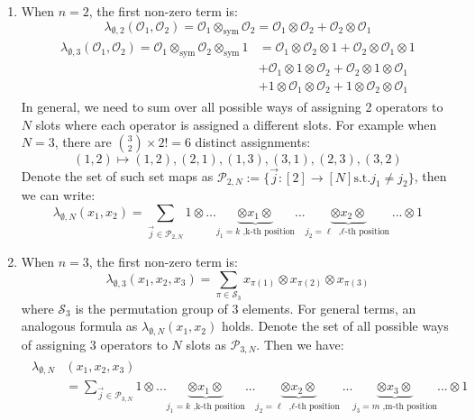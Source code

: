 \documentclass[a4paper,11pt]{article}
\theoremstyle{definition}
\numberwithin{equation}{section}
\begin{document}
\begin{enumerate}
    \item When $n = 2$, the first non-zero term is:
    \begin{equation}
        \lambda_{\emptyset, 2}(\mathcal{O}_1,\mathcal{O}_2) = \mathcal{O}_1\otimes_\text{sym}\mathcal{O}_2 = \mathcal{O}_1\otimes\mathcal{O}_2 + \mathcal{O}_2 \otimes\mathcal{O}_1
    \end{equation}
    \begin{align}
        \begin{split}
            \lambda_{\emptyset, 3}(\mathcal{O}_1,\mathcal{O}_2) = \mathcal{O}_1\otimes_\text{sym}\mathcal{O}_2\otimes_\text{sym} 1 &= \mathcal{O}_1\otimes\mathcal{O}_2 \otimes 1+ \mathcal{O}_2\otimes\mathcal{O}_1\otimes 1 
            \\& + \mathcal{O}_1\otimes 1\otimes\mathcal{O}_2 + \mathcal{O}_2 \otimes1\otimes\mathcal{O}_1
            \\& +1\otimes\mathcal{O}_1\otimes\mathcal{O}_2 + 1\otimes\mathcal{O}_2\otimes\mathcal{O}_1
        \end{split}
    \end{align}
    In general, we need to sum over all possible ways of assigning 2 operators to $N$ slots where each operator is assigned a different slots. For example when $N = 3$, there are $\binom{3}{2}\times 2! = 6$ distinct assignments:
    \begin{equation}
        (1,2)\mapsto(1,2), (2,1), (1,3), (3,1), (2,3), (3,2)
    \end{equation}Denote the set of such set maps as $\mathcal{P}_{2,N}:=\{\vec{j}:[2]\rightarrow[N]\text{s.t.}j_1 \neq j_2\}$, then we can write:
    \begin{equation}
        \lambda_{\emptyset, N}(x_1,x_2) = \sum_{\vec{j}\in\mathcal{P}_{2,N}}1\otimes...\underbrace{\otimes x_1\otimes}_{j_1 = k\text{ ,k-th position}}...\underbrace{\otimes x_2\otimes}_{j_2 = \ell\text{ ,$\ell$-th position}}...\otimes 1
    \end{equation}
    \item When $n = 3$, the first non-zero term is:
    \begin{equation}
        \lambda_{\emptyset, 3}(x_1,x_2,x_3) = \sum_{\pi\in\mathcal{S}_3}x_{\pi(1)}\otimes x_{\pi(2)}\otimes x_{\pi(3)}
    \end{equation}
    where $\mathcal{S}_3$ is the permutation group of $3$ elements. For general terms, an analogous formula as $\lambda_{\emptyset, N}(x_1,x_2)$ holds. Denote the set of all possible ways of assigning 3 operators to $N$ slots as $\mathcal{P}_{3,N}$. Then we have:
    \begin{align}
        \begin{split}
            \lambda_{\emptyset, N}&(x_1,x_2,x_3) \\&=  \sum_{\vec{j}\in\mathcal{P}_{3,N}}1\otimes...\underbrace{\otimes x_1\otimes}_{j_1 = k\text{ ,k-th position}}...\underbrace{\otimes x_2\otimes}_{j_2 = \ell\text{ ,$\ell$-th position}}...\underbrace{\otimes x_3\otimes}_{j_3 = m\text{ ,m-th position}}...\otimes 1
        \end{split}
    \end{align}
\end{enumerate}
\end{document}
